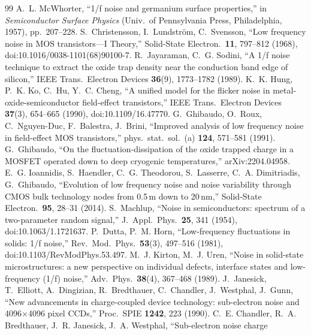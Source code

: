 \documentclass[10pt,a4paper]{article}
\begin{document}
\begin{thebibliography}{99}\small
{} A.~L. McWhorter, ``1/f noise and germanium surface properties,'' in \emph{Semiconductor
Surface Physics} (Univ.\ of Pennsylvania Press, Philadelphia, 1957), pp.~207--228.
 S.~Christensson, I.~Lundstr\"om, C.~Svensson, ``Low frequency noise in MOS transistors---I
Theory,'' Solid-State Electron.\ \textbf{11}, 797--812 (1968), doi:10.1016/0038-1101(68)90100-7.
 R.~Jayaraman, C.~G. Sodini, ``A 1/f noise technique to extract the oxide trap density near the
conduction band edge of silicon,'' IEEE Trans.\ Electron Devices \textbf{36}(9), 1773--1782 (1989).
 K.~K. Hung, P.~K. Ko, C.~Hu, Y.~C. Cheng, ``A unified model for the flicker noise in
metal-oxide-semiconductor field-effect transistors,'' IEEE Trans.\ Electron Devices \textbf{37}(3), 654--665 (1990),
doi:10.1109/16.47770.
 G.~Ghibaudo, O.~Roux, C.~Nguyen-Duc, F.~Balestra, J.~Brini, ``Improved analysis of low
frequency noise in field-effect MOS transistors,'' phys.\ stat.\ sol.\ (a) \textbf{124}, 571--581 (1991).
 G.~Ghibaudo, ``On the fluctuation-dissipation of the oxide trapped charge in a MOSFET operated
down to deep cryogenic temperatures,'' arXiv:2204.04958.
 E.~G. Ioannidis, S.~Haendler, C.~G. Theodorou, S.~Lasserre, C.~A. Dimitriadis, G.~Ghibaudo,
``Evolution of low frequency noise and noise variability through CMOS bulk technology nodes from 0.5\,\textmu m down to
20\,nm,'' Solid-State Electron.\ \textbf{95}, 28--31 (2014).
 S.~Machlup, ``Noise in semiconductors: spectrum of a two-parameter random signal,'' J.\ Appl.\
Phys.\ \textbf{25}, 341 (1954), doi:10.1063/1.1721637.
 P.~Dutta, P.~M. Horn, ``Low-frequency fluctuations in solids: 1/f noise,'' Rev.\ Mod.\ Phys.\
\textbf{53}(3), 497--516 (1981), doi:10.1103/RevModPhys.53.497.
\bibitem{kirton1989} M.~J. Kirton, M.~J. Uren, ``Noise in solid-state microstructures: a new perspective on individual
defects, interface states and low-frequency (1/f) noise,'' Adv.\ Phys.\ \textbf{38}(4), 367--468 (1989).
\bibitem{janesick1990} J.~Janesick, T.~Elliott, A.~Dingizian, R.~Bredthauer, C.~Chandler, J.~Westphal, J.~Gunn, ``New
advancements in charge-coupled device technology: sub-electron noise and 4096$\times$4096 pixel CCDs,'' Proc.\ SPIE
\textbf{1242}, 223 (1990).
\bibitem{chandler1990} C.~E. Chandler, R.~A. Bredthauer, J.~R. Janesick, J.~A. Westphal, ``Sub-electron noise charge

\end{thebibliography}
\end{document}
